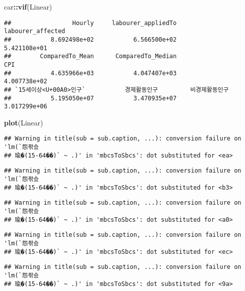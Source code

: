 \documentclass[]{article}
\newenvironment{Shaded}{\begin{snugshade}}{\end{snugshade}}
\newcommand{\KeywordTok}[1]{\textcolor[rgb]{0.13,0.29,0.53}{\textbf{#1}}}
\newcommand{\NormalTok}[1]{#1}
\newcommand{\OperatorTok}[1]{\textcolor[rgb]{0.81,0.36,0.00}{\textbf{#1}}}
\begin{document}
\begin{Shaded}
\begin{Highlighting}[]
\NormalTok{car}\OperatorTok{::}\KeywordTok{vif}\NormalTok{(Linear)}
\end{Highlighting}
\end{Shaded}

\begin{verbatim}
##                 Hourly     labourer_appliedTo      labourer_affected 
##           8.692498e+02           6.566500e+02           5.421108e+01 
##        ComparedTo_Mean      ComparedTo_Median                    CPI 
##           4.635966e+03           4.047407e+03           4.007738e+02 
## `15세이상<U+00A0>인구`           경제활동인구         비경제활동인구 
##           5.195050e+07           3.470935e+07           3.017299e+06
\end{verbatim}

\begin{Shaded}
\begin{Highlighting}[]
\KeywordTok{plot}\NormalTok{(Linear)}
\end{Highlighting}
\end{Shaded}

\begin{verbatim}
## Warning in title(sub = sub.caption, ...): conversion failure on 'lm(`怨좎슜
## 瑜�(15-64��)` ~ .)' in 'mbcsToSbcs': dot substituted for <ea>
\end{verbatim}

\begin{verbatim}
## Warning in title(sub = sub.caption, ...): conversion failure on 'lm(`怨좎슜
## 瑜�(15-64��)` ~ .)' in 'mbcsToSbcs': dot substituted for <b3>
\end{verbatim}

\begin{verbatim}
## Warning in title(sub = sub.caption, ...): conversion failure on 'lm(`怨좎슜
## 瑜�(15-64��)` ~ .)' in 'mbcsToSbcs': dot substituted for <a0>
\end{verbatim}

\begin{verbatim}
## Warning in title(sub = sub.caption, ...): conversion failure on 'lm(`怨좎슜
## 瑜�(15-64��)` ~ .)' in 'mbcsToSbcs': dot substituted for <ec>
\end{verbatim}

\begin{verbatim}
## Warning in title(sub = sub.caption, ...): conversion failure on 'lm(`怨좎슜
## 瑜�(15-64��)` ~ .)' in 'mbcsToSbcs': dot substituted for <9a>
\end{verbatim}
\end{document}
